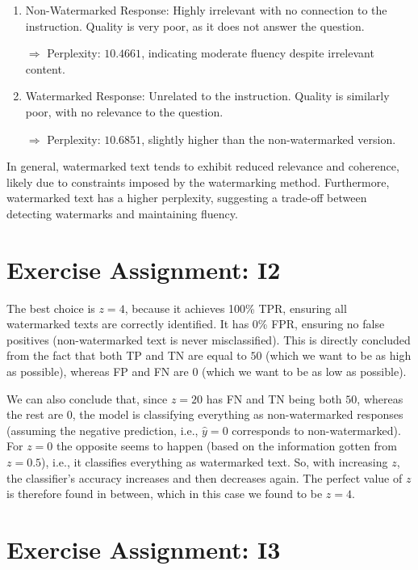 \documentclass{article}
\begin{document}
\begin{enumerate}
\begin{enumerate}
              \item Non-Watermarked Response: Highly irrelevant with no connection to the instruction. Quality is very poor, as it does not answer the question.

                    $\Rightarrow$ Perplexity: \( 10.4661 \), indicating moderate fluency despite irrelevant content.

              \item Watermarked Response: Unrelated to the instruction. Quality is similarly poor, with no relevance to the question.

                    $\Rightarrow$ Perplexity: \( 10.6851 \), slightly higher than the non-watermarked version.
          \end{enumerate}
\end{enumerate}

In general, watermarked text tends to exhibit reduced relevance and coherence, likely due to constraints imposed by the watermarking method. Furthermore, watermarked text has a higher perplexity, suggesting a trade-off between detecting watermarks and maintaining fluency.

\section{Exercise Assignment: I2}\label{sec:i2}
The best choice is $z = 4$, because it achieves 100\% TPR, ensuring all watermarked texts are correctly identified. It has 0\% FPR, ensuring no false positives (non-watermarked text is never misclassified). This is directly concluded from the fact that both TP and TN are equal to $50$ (which we want to be as high as possible), whereas FP and FN are $0$ (which we want to be as low as possible).

We can also conclude that, since $z=20$ has FN and TN being both $50$, whereas the rest are $0$, the model is classifying everything as non-watermarked responses (assuming the negative prediction, i.e., $\hat{y} = 0$  corresponds to non-watermarked). For $z=0$ the opposite seems to happen (based on the information gotten from $z=0.5$), i.e., it classifies everything as watermarked text. So, with increasing $z$, the classifier's accuracy increases and then decreases again. The perfect value of $z$ is therefore found in between, which in this case we found to be $z=4$.

\section{Exercise Assignment: I3}\label{sec:i3}
\end{document}
